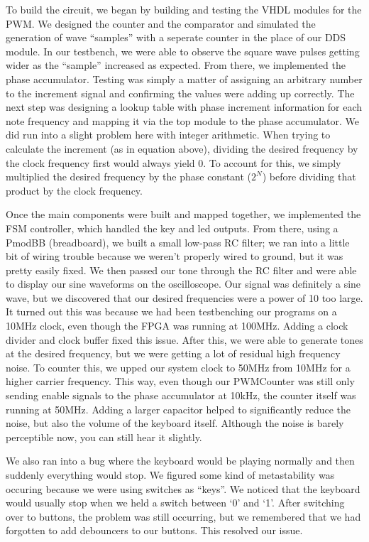 \documentclass{article}
\begin{document}
    To build the circuit, we began by building and testing the VHDL modules for the PWM. We designed the counter and the comparator and simulated the generation of wave ``samples'' with a seperate counter in the place of our DDS module. In our testbench, we were able to observe the square wave pulses getting wider as the ``sample'' increased as expected. From there, we implemented the phase accumulator. Testing was simply a matter of assigning an arbitrary number to the increment signal and confirming the values were adding up correctly. The next step was designing a lookup table with phase increment information for each note frequency and mapping it via the top module to the phase accumulator. We did run into a slight problem here with integer arithmetic. When trying to calculate the increment (as in equation above), dividing the desired frequency by the clock frequency first would always yield 0. To account for this, we simply multiplied the desired frequency by the phase constant ($2^N$) before dividing that product by the clock frequency.

    Once the main components were built and mapped together, we implemented the FSM controller, which handled the key and led outputs. From there, using a PmodBB (breadboard), we built a small low-pass RC filter; we ran into a little bit of wiring trouble because we weren't properly wired to ground, but it was pretty easily fixed. We then passed our tone through the RC filter and were able to display our sine waveforms on the oscilloscope. Our signal was definitely a sine wave, but we discovered that our desired frequencies were a power of 10 too large. It turned out this was because we had been testbenching our programs on a 10MHz clock, even though the FPGA was running at 100MHz. Adding a clock divider and clock buffer fixed this issue. After this, we were able to generate tones at the desired frequency, but we were getting a lot of residual high frequency noise. To counter this, we upped our system clock to 50MHz from 10MHz for a higher carrier frequency. This way, even though our PWMCounter was still only sending enable signals to the phase accumulator at 10kHz, the counter itself was running at 50MHz. Adding a larger capacitor helped to significantly reduce the noise, but also the volume of the keyboard itself. Although the noise is barely perceptible now, you can still hear it slightly.

    We also ran into a bug where the keyboard would be playing normally and then suddenly everything would stop. We figured some kind of metastability was occuring because we were using switches as ``keys''. We noticed that the keyboard would usually stop when we held a switch between `0' and `1'. After switching over to buttons, the problem was still occurring, but we remembered that we had forgotten to add debouncers to our buttons. This resolved our issue. 
\end{document}
